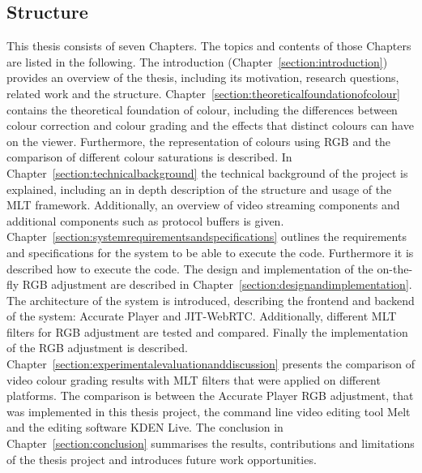 \documentclass[../MasterThesis.tex]{subfiles}
\begin{document}
	\subsection{Structure} \label{subsection:structure}
	
	This thesis consists of seven Chapters. The topics and contents of those Chapters are listed in the following.
	The introduction (Chapter~\ref{section:introduction}) provides an overview of the thesis, including its motivation, research questions, related work and the structure.
	Chapter~\ref{section:theoreticalfoundationofcolour} contains the theoretical foundation of colour, including the differences between colour correction and colour grading and the effects that distinct colours can have on the viewer. Furthermore, the representation of colours using RGB and the comparison of different colour saturations is described.
	In Chapter~\ref{section:technicalbackground} the technical background of the project is explained, including an in depth description of the structure and usage of the MLT framework. Additionally, an overview of video streaming components and additional components such as protocol buffers is given.
	Chapter~\ref{section:systemrequirementsandspecifications} outlines the requirements and specifications for the system to be able to execute the code. Furthermore it is described how to execute the code.
	The design and implementation of the on-the-fly RGB adjustment are described in Chapter~\ref{section:designandimplementation}. The architecture of the system is introduced, describing the frontend and backend of the system: Accurate Player and JIT-WebRTC. Additionally, different MLT filters for RGB adjustment are tested and compared. Finally the implementation of the RGB adjustment is described.
	Chapter~\ref{section:experimentalevaluationanddiscussion} presents the comparison of video colour grading results with MLT filters that were applied on different platforms. The comparison is between the Accurate Player RGB adjustment, that was implemented in this thesis project, the command line video editing tool Melt and the editing software KDEN Live.
	The conclusion in Chapter~\ref{section:conclusion} summarises the results, contributions and limitations of the thesis project and introduces future work opportunities.
		

	
	
	
	

	
	

	
	
	
\end{document}

